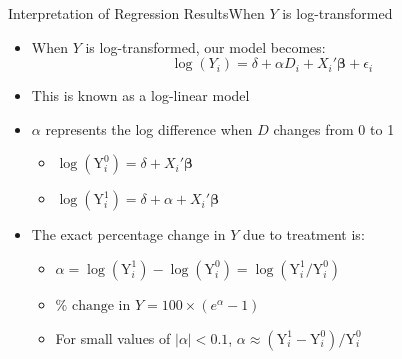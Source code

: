 \documentclass[dvipsnames,hyperref={pdfpagelabels=false}]{beamer}
\begin{document}
\begin{frame}{Interpretation of Regression Results}{When $Y$ is log-transformed}
	\begin{itemize}
		\item When $Y$ is log-transformed, our model becomes:
		\vspace{0.2cm}
		\begin{equation*}
			\log(Y_i) = \delta + \alpha D_i + X_{i}' \boldsymbol{\beta}  + \epsilon_{i}
		\end{equation*}
		\vspace{0.2cm}
		\item This is known as a log-linear model
		\vspace{0.2cm}
		\item $\alpha$ represents the log difference when $D$ changes from 0 to 1
		\vspace{0.2cm}
		\begin{itemize}
			\item $\log(\mathrm{Y}^{0}_i) = \delta + X_{i}' \boldsymbol{\beta} $ 
			\vspace{0.2cm}
			\item $\log(\mathrm{Y}^{1}_i) = \delta + \alpha + X_{i}' \boldsymbol{\beta}$ 
			\vspace{0.2cm}
		\end{itemize}
		
		
		\item The exact percentage change in $Y$ due to treatment is:
		\vspace{0.2cm}
		\begin{itemize}
			\item $\alpha = \log(\mathrm{Y}^{1}_i) - \log(\mathrm{Y}^{0}_i) = \log(\mathrm{Y}^{1}_i/\mathrm{Y}^{0}_i)$
			\vspace{0.1cm}
			\item $\% \text{ change in } Y = 100 \times (e^{\alpha} - 1)$
			\vspace{0.2cm}
			\item For small values of $|\alpha| < 0.1$, $\alpha \approx (\mathrm{Y}^{1}_i-\mathrm{Y}^{0}_i)/\mathrm{Y}^{0}_i$
		\end{itemize}
	\end{itemize}
\end{frame}
\end{document}
